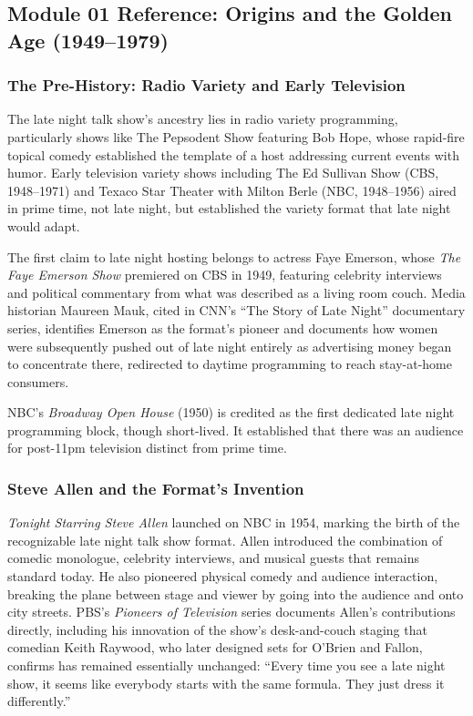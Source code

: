 \documentclass[11pt,letterpaper]{article}
\begin{document}
\subsection{Module 01 Reference: Origins and the Golden Age (1949--1979)}

\subsubsection{The Pre-History: Radio Variety and Early Television}
The late night talk show's ancestry lies in radio variety programming, particularly shows like The Pepsodent Show featuring Bob Hope, whose rapid-fire topical comedy established the template of a host addressing current events with humor. Early television variety shows including The Ed Sullivan Show (CBS, 1948--1971) and Texaco Star Theater with Milton Berle (NBC, 1948--1956) aired in prime time, not late night, but established the variety format that late night would adapt.

The first claim to late night hosting belongs to actress Faye Emerson, whose \textit{The Faye Emerson Show} premiered on CBS in 1949, featuring celebrity interviews and political commentary from what was described as a living room couch. Media historian Maureen Mauk, cited in CNN's ``The Story of Late Night'' documentary series, identifies Emerson as the format's pioneer and documents how women were subsequently pushed out of late night entirely as advertising money began to concentrate there, redirected to daytime programming to reach stay-at-home consumers.

NBC's \textit{Broadway Open House} (1950) is credited as the first dedicated late night programming block, though short-lived. It established that there was an audience for post-11pm television distinct from prime time.

\subsubsection{Steve Allen and the Format's Invention}
\textit{Tonight Starring Steve Allen} launched on NBC in 1954, marking the birth of the recognizable late night talk show format. Allen introduced the combination of comedic monologue, celebrity interviews, and musical guests that remains standard today. He also pioneered physical comedy and audience interaction, breaking the plane between stage and viewer by going into the audience and onto city streets. PBS's \textit{Pioneers of Television} series documents Allen's contributions directly, including his innovation of the show's desk-and-couch staging that comedian Keith Raywood, who later designed sets for O'Brien and Fallon, confirms has remained essentially unchanged: ``Every time you see a late night show, it seems like everybody starts with the same formula. They just dress it differently.''
\end{document}
